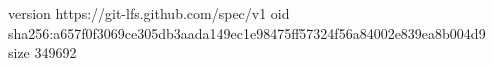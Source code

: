 version https://git-lfs.github.com/spec/v1
oid sha256:a657f0f3069ce305db3aada149ec1e98475ff57324f56a84002e839ea8b004d9
size 349692
